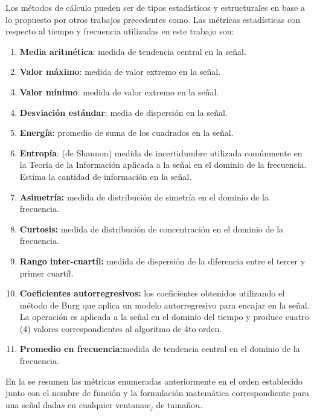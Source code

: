 Los métodos de cálculo pueden ser de tipos estadísticos y estructurales
\cite{LaraLabrador2013} en base a lo propuesto por otros trabajos
precedentes como\cite{Yang2009,Bao2004}. Las métricas estadísticas
con respecto al tiempo y frecuencia utilizadas en este trabajo son:
\begin{enumerate}
\item \textbf{Media aritmética}: medida de tendencia central en la señal.
\item \textbf{Valor máximo}: medida de valor extremo en la señal.
\item \textbf{Valor mínimo}: medida de valor extremo en la señal.
\item \textbf{Desviación estándar}: media de dispersión en la señal.
\item \textbf{Energía}: promedio de suma de los cuadrados en la señal.
\item \textbf{Entropía}: (de Shannon) medida de incertidumbre utilizada
comúnmente en la Teoría de la Información aplicada a la señal en el
dominio de la frecuencia. Estima la cantidad de información en la
señal.
\item \textbf{Asimetría:} medida de distribución de simetría en el dominio
de la frecuencia.
\item \textbf{Curtosis:} medida de distribución de concentración en el dominio
de la frecuencia.
\item \textbf{Rango inter-cuartíl:} medida de dispersión de la diferencia
entre el tercer y primer cuartíl.
\item \textbf{Coeficientes autorregresivos:} los coeficientes obtenidos
utilizando el método de Burg que aplica un modelo autorregresivo para
encajar en la señal. La operación es aplicada a la señal en el dominio
del tiempo y produce cuatro (4) valores correspondientes al algoritmo
de 4to orden.
\item \textbf{Promedio en frecuencia:}medida de tendencia central en el
dominio de la frecuencia.
\end{enumerate}
En la  se resumen las métricas enumeradas anteriormente
en el orden establecido junto con el nombre de función y la formulación
matemática correspondiente para una señal dada$s$ en cualquier ventana$w_{j}$
de tamaño$n$.


